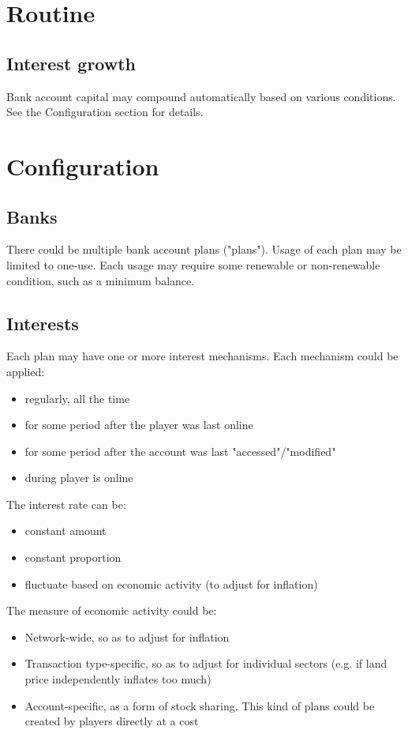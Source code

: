 \documentclass{report}
\begin{document}
		\chapter{Routine}
			\section{Interest growth}
				Bank account capital may compound automatically based on various conditions. See the Configuration section for details.

		\chapter{Configuration}
			\section{Banks}
				There could be multiple bank account plans ("plans").
				Usage of each plan may be limited to one-use.
				Each usage may require some renewable or non-renewable condition, such as a minimum balance.

			\section{Interests}
				Each plan may have one or more interest mechanisms.
				Each mechanism could be applied:
				\begin{itemize}
					\item regularly, all the time
					\item for some period after the player was last online
					\item for some period after the account was last "accessed"/"modified"
					\item during player is online
				\end{itemize}

				The interest rate can be:
				\begin{itemize}
					\item constant amount
					\item constant proportion
					\item fluctuate based on economic activity (to adjust for inflation)
				\end{itemize}

				The measure of economic activity could be:
				\begin{itemize}
					\item Network-wide, so as to adjust for inflation
					\item Transaction type-specific, so as to adjust for individual sectors (e.g. if land price independently inflates too much)
					\item Account-specific, as a form of stock sharing.
						This kind of plans could be created by players directly at a cost
				\end{itemize}
\end{document}
